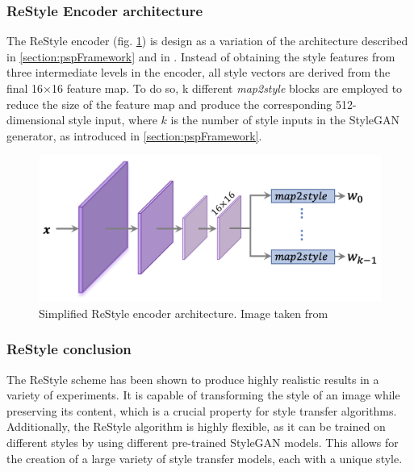 \subsubsection{ReStyle Encoder architecture}
 The ReStyle encoder (fig. \ref{fig:ReStyle encoder architecture}) is design as a variation of the architecture described in \ref{section:pspFramework} and in \cite{e4e}. Instead of obtaining the style features from three intermediate levels in the encoder, all style vectors are derived from the final 16×16 feature map. To do so, k different \textit{map2style} blocks are employed to reduce the size of the feature map and produce the corresponding 512-dimensional style input, where $k$ is the number of style inputs in the StyleGAN generator, as introduced in \ref{section:pspFramework}.
 \begin{figure}[htbp]
\centering
  \includegraphics[scale=0.5]{figures/restyle-encoderArchitecture.png}
  \caption{Simplified ReStyle encoder architecture. Image taken from \cite{alaluf2021restyle}}
  \label{fig:ReStyle encoder architecture}
\end{figure}


 \subsubsection{ReStyle conclusion}
The ReStyle scheme has been shown to produce highly realistic results in a variety of experiments. It is capable of transforming the style of an image while preserving its content, which is a crucial property for style transfer algorithms. Additionally, the ReStyle algorithm is highly flexible, as it can be trained on different styles by using different pre-trained StyleGAN models. This allows for the creation of a large variety of style transfer models, each with a unique style.
